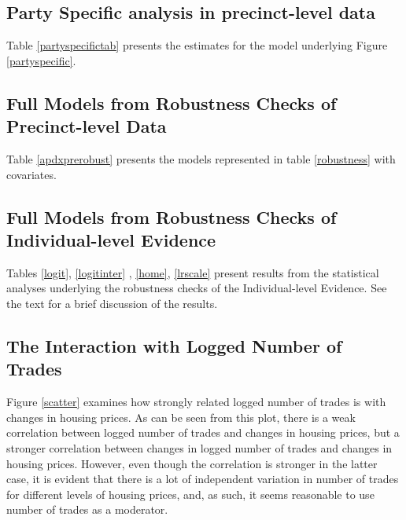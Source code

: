 \documentclass[12pt,a4paper]{article}
\begin{document}
			\newpage
			
			\subsection{Party Specific analysis in precinct-level data} \label{app_partyspec}
			\setcounter{table}{0}
			
			Table \ref{partyspecifictab} presents the estimates for the model underlying Figure \ref{partyspecific}. 
			
			
			
			\subsection{Full Models from Robustness Checks of Precinct-level Data} \label{app_robustpred}
			\setcounter{table}{0}
			
			Table \ref{apdxprerobust} presents the models represented in table \ref{robustness} with covariates.
			
			 
			
			\subsection{Full Models from Robustness Checks of Individual-level Evidence} \label{app_robustind}
			
			\setcounter{table}{0}
			
			Tables \ref{logit}, \ref{logitinter} , \ref{home}, \ref{lrscale} present results from the statistical analyses underlying the robustness checks of the Individual-level Evidence. See the text for a brief discussion of the results.
			
			
			
			
			
			
			
			\subsection{The Interaction with Logged Number of Trades} \label{app_interaction}
			\setcounter{table}{0}
			\setcounter{figure}{0}
			
			Figure \ref{scatter} examines how strongly related logged number of trades is with changes in housing prices. As can be seen from this plot, there is a weak correlation between logged number of trades and changes in housing prices, but a stronger correlation between changes in logged number of trades and changes in housing prices. However, even though the correlation is stronger in the latter case, it is evident that there is a lot of independent variation in number of trades for different levels of housing prices, and, as such, it seems reasonable to use number of trades as a moderator.
			
\end{document}
